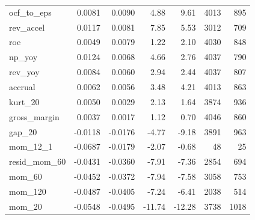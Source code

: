 {\begin{longtable}{@{}lrrrrrr@{}}
ocf\_to\_eps & 0.0081 & 0.0090 & 4.88 & 9.61 & 4013 & 895 \\
rev\_accel & 0.0117 & 0.0081 & 7.85 & 5.53 & 3012 & 709 \\
roe & 0.0049 & 0.0079 & 1.22 & 2.10 & 4030 & 848 \\
np\_yoy & 0.0124 & 0.0068 & 4.66 & 2.76 & 4037 & 790 \\
rev\_yoy & 0.0084 & 0.0060 & 2.94 & 2.44 & 4037 & 807 \\
accrual & 0.0062 & 0.0056 & 3.48 & 4.21 & 4013 & 863 \\
kurt\_20 & 0.0050 & 0.0029 & 2.13 & 1.64 & 3874 & 936 \\
gross\_margin & 0.0037 & 0.0017 & 1.12 & 0.70 & 4046 & 860 \\
gap\_20 & -0.0118 & -0.0176 & -4.77 & -9.18 & 3891 & 963 \\
mom\_12\_1 & -0.0687 & -0.0179 & -2.07 & -0.68 & 48 & 25 \\
resid\_mom\_60 & -0.0431 & -0.0360 & -7.91 & -7.36 & 2854 & 694 \\
mom\_60 & -0.0452 & -0.0372 & -7.94 & -7.58 & 3058 & 753 \\
mom\_120 & -0.0487 & -0.0405 & -7.24 & -6.41 & 2038 & 514 \\
mom\_20 & -0.0548 & -0.0495 & -11.74 & -12.28 & 3738 & 1018 \\
\bottomrule
\end{longtable}
}
